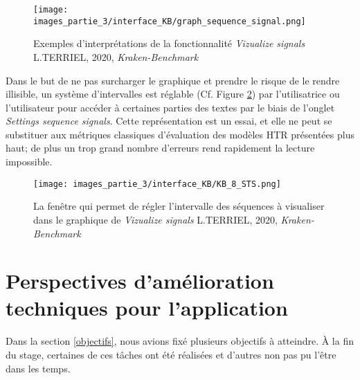 \begin{figure}[h!]
    \centering
    \texttt{[image: images\_partie\_3/interface\_KB/graph\_sequence\_signal.png]}
        \caption{Exemples d'interprétations de la fonctionnalité  \textit{Vizualize signals} \textcopyright L.TERRIEL, 2020, \textit{Kraken-Benchmark}}
        \label{fig:accueil_KB_7}
\end{figure}

Dans le but de ne pas surcharger le graphique et prendre le risque de le rendre illisible, un système d'intervalles est réglable (Cf. Figure \ref{fig:accueil_KB_6}) par l'utilisatrice ou l'utilisateur pour accéder à certaines parties des textes par le biais de l'onglet \textit{Settings sequence signals}. Cette représentation est un essai, et elle ne peut se substituer aux métriques classiques d'évaluation des modèles HTR présentées plus haut; de plus un trop grand nombre d'erreurs rend rapidement la lecture impossible.

\begin{figure}[h!]
    \centering
    \texttt{[image: images\_partie\_3/interface\_KB/KB\_8\_STS.png]}
        \caption{La fenêtre  qui permet de régler l'intervalle des séquences à visualiser dans le graphique de \textit{Vizualize signals} \textcopyright L.TERRIEL, 2020, \textit{Kraken-Benchmark}}
        \label{fig:accueil_KB_6}
\end{figure}

\newpage
\section{Perspectives d'amélioration techniques pour l'application}\label{perspectives_amélios}

Dans la section \ref{objectifs}, nous avions fixé plusieurs objectifs à atteindre. À la fin du stage, certaines de ces tâches ont été réalisées et d'autres non pas pu l'être dans les temps. 

